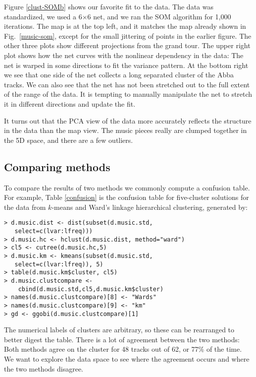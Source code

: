 Figure \ref{clust-SOMb} shows our favorite fit to the data. The data
was standardized, we used a 6$\times$6 net, and we ran the SOM algorithm for
1,000 iterations. The map is at the top left, and it matches the map
already shown in Fig.~\ref{music-som}, except for the small
jittering of points in the earlier figure. The other three plots show
different projections from the grand tour.  The upper right plot shows
how the net curves with the nonlinear dependency in the data: The net
is warped in some directions to fit the variance pattern.  At the
bottom right we see that one side of the net collects a long separated
cluster of the Abba tracks. We can also see that the net has not been
stretched out to the full extent of the range of the data. It is
tempting to manually manipulate the net to stretch it in different
directions and update the fit.

It turns out that the PCA view of the data more accurately reflects
the structure in the data than the map view.  The music pieces really
are clumped together in the 5D space, and there are a few outliers.

\subsection{Comparing methods}


To compare the results of two methods we commonly compute a confusion
table. For example, Table \ref{confusion} is the confusion table for
five-cluster solutions for the  data from $k$-means and
Ward's linkage hierarchical clustering, generated by:

\begin{verbatim}
> d.music.dist <- dist(subset(d.music.std,
   select=c(lvar:lfreq)))
> d.music.hc <- hclust(d.music.dist, method="ward")
> cl5 <- cutree(d.music.hc,5)
> d.music.km <- kmeans(subset(d.music.std,
   select=c(lvar:lfreq)), 5)
> table(d.music.km$cluster, cl5)
> d.music.clustcompare <- 
    cbind(d.music.std,cl5,d.music.km$cluster)
> names(d.music.clustcompare)[8] <- "Wards"
> names(d.music.clustcompare)[9] <- "km"
> gd <- ggobi(d.music.clustcompare)[1]
\end{verbatim}

\noindent The numerical labels of clusters are arbitrary, so these can
be rearranged to better digest the table. There is a lot of agreement
between the two methods: Both methods agree on the cluster for 48
tracks out of 62, or 77\% of the time.  We want to explore the data
space to see where the agreement occurs and where the two methods
disagree.

